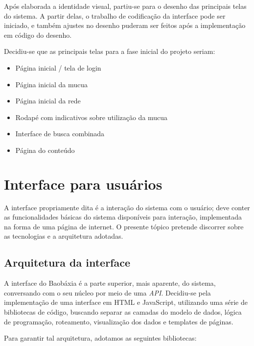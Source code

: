 Após elaborada a identidade visual, partiu-se para o desenho das
principais telas do sistema. A partir delas, o trabalho de codificação
da interface pode ser iniciado, e também ajustes no desenho puderam ser
feitos após a implementação em código do desenho.

Decidiu-se que as principais telas para a fase inicial do projeto seriam:
\begin{itemize}
  \item Página inicial / tela de login
  \item Página inicial da mucua
  \item Página inicial da rede
  \item Rodapé com indicativos sobre utilização da mucua
  \item Interface de busca combinada
  \item Página do conteúdo
\end{itemize}

\newpage
\newpage
\newpage



\section{Interface para usuários}
A interface propriamente dita é a interação do sistema com o usuário;
deve conter as funcionalidades básicas do sistema disponíveis para
interação, implementada na forma de uma página de internet. O presente
tópico pretende discorrer sobre as tecnologias e a arquitetura adotadas.


\subsection{Arquitetura da interface}
A interface do Baobáxia é a parte superior, mais aparente, do sistema,
conversando com o seu núcleo por meio de uma \emph{API}. Decidiu-se
pela implementação de uma interface em HTML e JavaScript, utilizando
uma série de bibliotecas de código, buscando separar as camadas do modelo
de dados, lógica de programação, roteamento, visualização dos dados e
templates de páginas.

Para garantir tal arquitetura, adotamos as seguintes bibliotecas:

